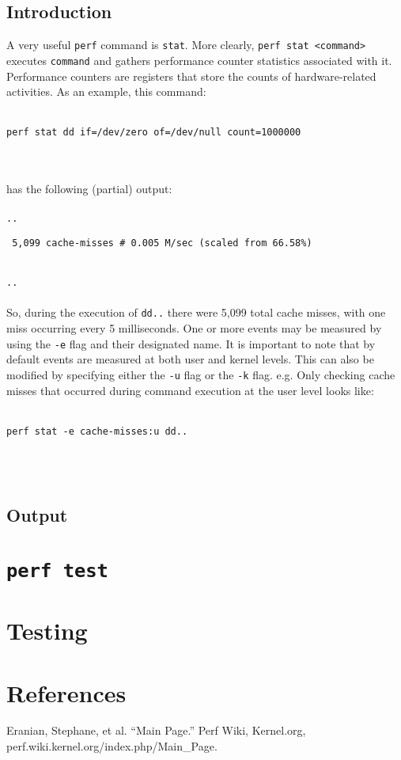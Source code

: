 \documentclass{article}
\begin{document}
\subsection{Introduction}
A very useful \verb|perf| command is \verb|stat|. More clearly, \texttt{perf stat <command>} executes \texttt{command} and gathers performance counter statistics associated with it. Performance counters are registers that store the counts of hardware-related activities. As an example, this command:
\\\\
\centerline{\texttt{perf stat dd if=/dev/zero of=/dev/null count=1000000}}
\\\\
has the following (partial) output:
\\\\
\texttt{..}\\
\centerline{\texttt{ 5,099 cache-misses \hspace{5mm} \# \hspace{5mm} 0.005 M/sec (scaled from 66.58\%)}}\\
\texttt{..}
\\\\
So, during the execution of \verb|dd..| there were 5,099 total cache misses, with one miss occurring every 5 milliseconds.
One or more events may be measured by using the \texttt{-e} flag and their designated name. It is important to note that by default events are measured at both user and kernel levels. This can also be modified by specifying either the \texttt{-u} flag or the \texttt{-k} flag. e.g. Only checking cache misses that occurred during command execution at the user level looks like:
\\\\
\centerline{\texttt{perf stat -e cache-misses:u dd..}}
\\\\
\subsection{Output}
\section{\texttt{perf test}}
\section{Testing}
\pagebreak
\section{References}
Eranian, Stephane, et al. “Main Page.” Perf Wiki, Kernel.org,
\\perf.wiki.kernel.org/index.php/Main\_Page.
\end{document}
